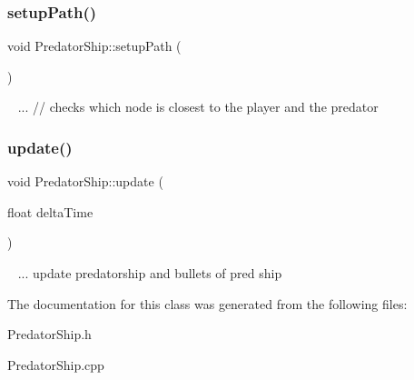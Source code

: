 \subsubsection{\texorpdfstring{setup\+Path()}{setupPath()}}
{\footnotesize\ttfamily void Predator\+Ship\+::setup\+Path (\begin{DoxyParamCaption}{ }\end{DoxyParamCaption})}

~\newline
... // checks which node is closest to the player and the predator\mbox{\label{class_predator_ship_aaecc92f60ecbaaaf2f41edbe15a458ea}} 
\subsubsection{\texorpdfstring{update()}{update()}}
{\footnotesize\ttfamily void Predator\+Ship\+::update (\begin{DoxyParamCaption}\item[{float}]{delta\+Time }\end{DoxyParamCaption})}

~\newline
... update predatorship and bullets of pred ship

The documentation for this class was generated from the following files\+:\begin{DoxyCompactItemize}
\item 
Predator\+Ship.\+h\item 
Predator\+Ship.\+cpp\end{DoxyCompactItemize}

